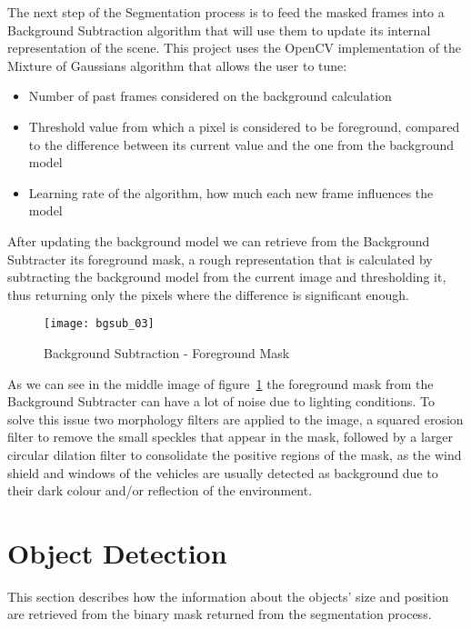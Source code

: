 The next step of the Segmentation process is to feed the masked frames into a Background Subtraction algorithm that will use them to update its internal representation of the scene. This project uses the OpenCV implementation of the Mixture of Gaussians algorithm that allows the user to tune:

\begin{itemize}
	\item Number of past frames considered on the background calculation
	\item Threshold value from which a pixel is considered to be foreground, compared to the difference between its current value and the one from the background model
	\item Learning rate of the algorithm, how much each new frame influences the model
\end{itemize}

After updating the background model we can retrieve from the Background Subtracter its foreground mask, a rough representation that is calculated by subtracting the background model from the current image and thresholding it, thus returning only the pixels where the difference is significant enough.

\begin{figure}[h]
  \begin{center}
    \leavevmode
    \texttt{[image: bgsub\_03]}
    \caption{Background Subtraction - Foreground Mask}
    \label{fig:bgsub_02}
  \end{center}
\end{figure}

As we can see in the middle image of figure~\ref{fig:bgsub_02} the foreground mask from the Background Subtracter can have a lot of noise due to lighting conditions. To solve this issue two morphology filters are applied to the image, a squared erosion filter to remove the small speckles that appear in the mask, followed by a larger circular dilation filter to consolidate the positive regions of the mask, as the wind shield and windows of the vehicles are usually detected as background due to their dark colour and/or reflection of the environment.

\section{Object Detection}

This section describes how the information about the objects' size and position are retrieved from the binary mask returned from the segmentation process. 

